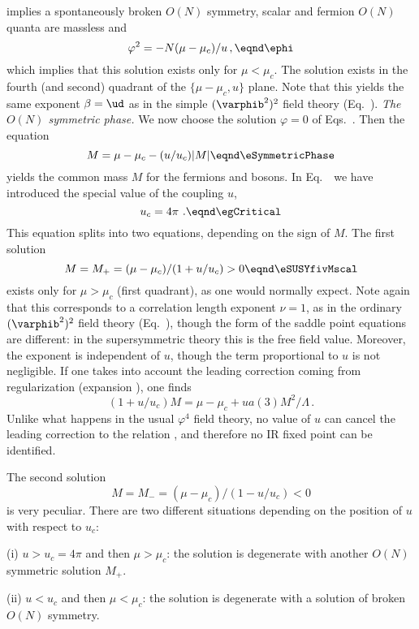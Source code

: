 implies a spontaneously broken $O(N)$ symmetry, scalar and fermion
$O(N)$ quanta are massless and
$$\varphi^2 =-N(\mu-\mu_c)/u\,, \eqnd\ephi$$
which implies that this solution exists only for $ \mu<\mu_c$. The
solution exists in the fourth (and second) quadrant of the
$\{ \mu-\mu_c , u \}$ plane. Note that this yields the same  exponent $\beta=\ud $
as in the simple $(\varphib^2)^2$ field theory  (Eq.~\expbeta).
\smallskip
{\it The $O(N)$ symmetric phase.} We now choose the solution $\varphi=0$
of Eqs.~\eSUSYiii. Then the equation
$$M=\mu-\mu_c - (u/u_c)|M| \eqnd\eSymmetricPhase$$
yields the common mass $M$ for the fermions and bosons. In
Eq.~\eSymmetricPhase\ we have introduced the special value of the coupling $u$,
$$u_c= 4\pi  \ . \eqnd\egCritical$$
This equation splits into two equations, depending on the sign of $M$.
The first solution
$$M= M_+=(\mu-\mu_c)/(1+u/u_c) >  0\eqnd\eSUSYfivMscal $$
exists only for $\mu>\mu_c$ (first quadrant), as one would normally expect.
Note again that this corresponds to a correlation length exponent $\nu=1$, as in the ordinary $(\varphib^2)^2$ field theory (Eq.~\ecorlenb), though the form of the saddle point equations are different: in the supersymmetric theory this is the free field value.
Moreover, the exponent is independent of $u$, though the term proportional to $u$ is not negligible.  If one takes into account the leading correction coming from regularization (expansion \etadepolii), one finds
$$(1+u/u_c) M = \mu-\mu_c +u a(3)M^2/\Lambda \,.$$
Unlike what happens in the usual $\varphi^4$ field theory, no value of
$u$ can cancel the leading correction to the relation
\eSUSYfivMscal, and therefore no IR fixed point can be identified.
\par
The second solution
$$M=
M_-=(\mu-\mu_c)/(1-u/u_c) < 0 $$
is very peculiar. There are two different situations depending on the position of $u$ with respect to $u_c$: \par
(i) $u>u_c=4\pi$ and then $\mu>\mu_c$:  the solution is degenerate with another $O(N)$ symmetric solution $M_+$.\par
(ii) $u<u_c$ and then $\mu<\mu_c$: the solution is degenerate with a solution of broken $O(N)$ symmetry. \par
\midinsert \epsfxsize=13.5cm \epsfysize=11cm  \vskip
-5.2cm \hskip2cm 
\vskip -5.8cm
